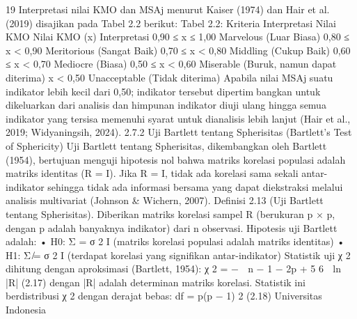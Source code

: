 19
Interpretasi nilai KMO dan MSAj menurut Kaiser (1974) dan Hair et al. (2019)
disajikan pada Tabel 2.2 berikut:
Tabel 2.2: Kriteria Interpretasi Nilai KMO
Nilai KMO (x) Interpretasi
0,90 ≤ x ≤ 1,00 Marvelous (Luar Biasa)
0,80 ≤ x < 0,90 Meritorious (Sangat Baik)
0,70 ≤ x < 0,80 Middling (Cukup Baik)
0,60 ≤ x < 0,70 Mediocre (Biasa)
0,50 ≤ x < 0,60 Miserable (Buruk, namun dapat diterima)
x < 0,50 Unacceptable (Tidak diterima)
Apabila nilai MSAj suatu indikator lebih kecil dari 0,50; indikator tersebut dipertimbangkan untuk dikeluarkan dari analisis dan himpunan indikator diuji ulang hingga semua
indikator yang tersisa memenuhi syarat untuk dianalisis lebih lanjut (Hair et al., 2019;
Widyaningsih, 2024).
2.7.2 Uji Bartlett tentang Spherisitas (Bartlett’s Test of Sphericity)
Uji Bartlett tentang Spherisitas, dikembangkan oleh Bartlett (1954), bertujuan menguji
hipotesis nol bahwa matriks korelasi populasi adalah matriks identitas (R = I). Jika R = I,
tidak ada korelasi sama sekali antar-indikator sehingga tidak ada informasi bersama yang
dapat diekstraksi melalui analisis multivariat (Johnson & Wichern, 2007).
Definisi 2.13 (Uji Bartlett tentang Spherisitas). Diberikan matriks korelasi sampel R
(berukuran p × p, dengan p adalah banyaknya indikator) dari n observasi. Hipotesis uji
Bartlett adalah:
• H0: Σ = σ
2
I (matriks korelasi populasi adalah matriks identitas)
• H1: Σ ̸= σ
2
I (terdapat korelasi yang signifikan antar-indikator)
Statistik uji χ
2 dihitung dengan aproksimasi (Bartlett, 1954):
χ
2 = −

n − 1 −
2p + 5
6

ln |R| (2.17)
dengan |R| adalah determinan matriks korelasi. Statistik ini berdistribusi χ
2 dengan derajat
bebas:
df =
p(p − 1)
2
(2.18)
Universitas Indonesia

